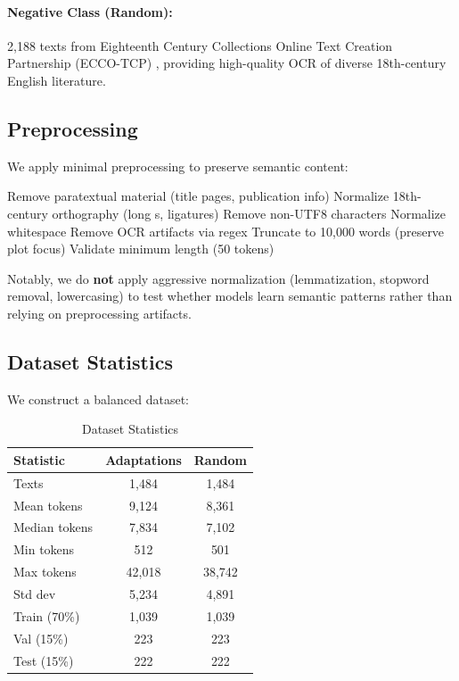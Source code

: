 \documentclass[11pt]{article}
\begin{document}
\paragraph{Negative Class (Random):} 2,188 texts from Eighteenth Century Collections Online Text Creation Partnership (ECCO-TCP) \cite{Welzenbach2011ECCO}, providing high-quality OCR of diverse 18th-century English literature.

\subsection{Preprocessing}

We apply minimal preprocessing to preserve semantic content:

\begin{algorithm}
\caption{Text Preprocessing}
\begin{algorithmic}[1]
\STATE Remove paratextual material (title pages, publication info)
\STATE Normalize 18th-century orthography (long s, ligatures) \cite{Underwood2015DataMunging}
\STATE Remove non-UTF8 characters
\STATE Normalize whitespace
\STATE Remove OCR artifacts via regex
\STATE Truncate to 10,000 words (preserve plot focus)
\STATE Validate minimum length (50 tokens)
\end{algorithmic}
\end{algorithm}

Notably, we do \textbf{not} apply aggressive normalization (lemmatization, stopword removal, lowercasing) to test whether models learn semantic patterns rather than relying on preprocessing artifacts.

\subsection{Dataset Statistics}

We construct a balanced dataset:

\begin{table}[h]
\centering
\small
\caption{Dataset Statistics}
\begin{tabular}{lcc}
\toprule
\textbf{Statistic} & \textbf{Adaptations} & \textbf{Random} \\
\midrule
Texts & 1,484 & 1,484 \\
Mean tokens & 9,124 & 8,361 \\
Median tokens & 7,834 & 7,102 \\
Min tokens & 512 & 501 \\
Max tokens & 42,018 & 38,742 \\
Std dev & 5,234 & 4,891 \\
\midrule
Train (70\%) & 1,039 & 1,039 \\
Val (15\%) & 223 & 223 \\
Test (15\%) & 222 & 222 \\
\bottomrule
\end{tabular}
\end{table}
\end{document}
